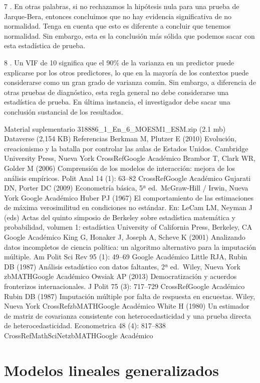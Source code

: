 \documentclass[
]{book}
\begin{document}
7 .
En otras palabras, si no rechazamos la hipótesis nula para una prueba de Jarque-Bera, entonces concluimos que no hay evidencia significativa de no normalidad. Tenga en cuenta que esto es diferente a concluir que tenemos normalidad. Sin embargo, esta es la conclusión más sólida que podemos sacar con esta estadística de prueba.

8 .
Un VIF de 10 significa que el 90\% de la varianza en un predictor puede explicarse por los otros predictores, lo que en la mayoría de los contextos puede considerarse como un gran grado de varianza común. Sin embargo, a diferencia de otras pruebas de diagnóstico, esta regla general no debe considerarse una estadística de prueba. En última instancia, el investigador debe sacar una conclusión sustancial de los resultados.

Material suplementario
318886\_1\_En\_6\_MOESM1\_ESM.zip (2.1 mb)
Dataverse (2,154 KB)
Referencias
Berkman M, Plutzer E (2010) Evolución, creacionismo y la batalla por controlar las aulas de Estados Unidos. Cambridge University Press, Nueva York
CrossRefGoogle Académico
Brambor T, Clark WR, Golder M (2006) Comprensión de los modelos de interacción: mejora de los análisis empíricos. Polit Anal 14 (1): 63--82
CrossRefGoogle Académico
Gujarati DN, Porter DC (2009) Econometría básica, 5ª ed.~McGraw-Hill / Irwin, Nueva York
Google Académico
Huber PJ (1967) El comportamiento de las estimaciones de máxima verosimilitud en condiciones no estándar. En: LeCam LM, Neyman J (eds) Actas del quinto simposio de Berkeley sobre estadística matemática y probabilidad, volumen 1: estadística University of California Press, Berkeley, CA
Google Académico
King G, Honaker J, Joseph A, Scheve K (2001) Analizando datos incompletos de ciencia política: un algoritmo alternativo para la imputación múltiple. Am Polit Sci Rev 95 (1): 49--69
Google Académico
Little RJA, Rubin DB (1987) Análisis estadístico con datos faltantes, 2ª ed.~Wiley, Nueva York
zbMATHGoogle Académico
Owsiak AP (2013) Democratización y acuerdos fronterizos internacionales. J Polit 75 (3): 717--729
CrossRefGoogle Académico
Rubin DB (1987) Imputación múltiple por falta de respuesta en encuestas. Wiley, Nueva York
CrossRefzbMATHGoogle Académico
White H (1980) Un estimador de matriz de covarianza consistente con heterocedasticidad y una prueba directa de heterocedasticidad. Econometrica 48 (4): 817--838
CrossRefMathSciNetzbMATHGoogle Académico

\hypertarget{Modeloslinealesgeneralizados}{%
\chapter{Modelos lineales generalizados}\label{Modeloslinealesgeneralizados}}
\end{document}
